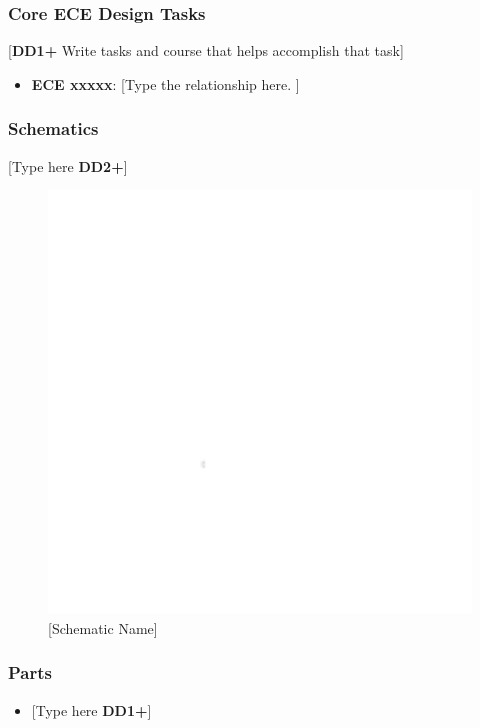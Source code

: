 \subsubsection{Core ECE Design Tasks}
[\textbf{DD1+} Write tasks and course that helps accomplish that task]
\begin{itemize}
    \item \textbf{ECE xxxxx}: [Type the relationship here. ]
\end{itemize}

\subsubsection{Schematics}
[Type here \textbf{DD2+}]
\begin{figure}[h]
    \centering
    \includegraphics[width=16cm]{images/white.png} %
    \caption{[Schematic Name]}
\end{figure} %

\subsubsection{Parts}
\begin{itemize}
    \item {[Type here \textbf{DD1+}]}
\end{itemize}


